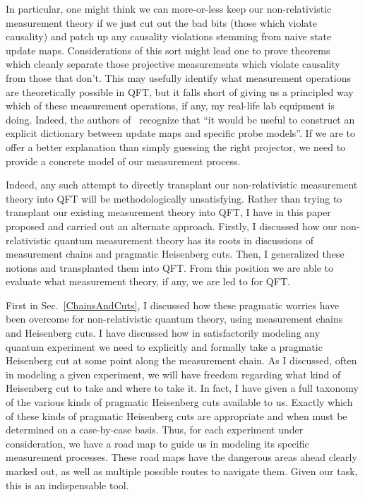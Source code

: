 \documentclass[prd,twocolumn,superscriptaddress,floatfix,amsmath,amssymb,amsfonts,nofootinbib]{revtex4-2}
\begin{document}
In particular, one might think we can more-or-less keep our non-relativistic measurement theory if we just cut out the bad bits (those which violate causality) and patch up any causality violations stemming from naive state update maps. Considerations of this sort might lead one to prove theorems~\cite{BorstenJubbKells,Jubb2022} which cleanly separate those projective measurements which violate causality from those that don't. This may usefully identify what measurement operations are theoretically possible in QFT, but it falls short of giving us a principled way which of these measurement operations, if any, my real-life lab equipment is doing. Indeed, the authors of~\cite{Jubb2022} recognize that ``it would be useful to construct an explicit
dictionary between update maps and specific probe models''. If we are to offer a better explanation than simply guessing the right projector, we need to provide a concrete model of our measurement process.

Indeed, any such attempt to directly transplant our non-relativistic measurement theory into QFT will be methodologically unsatisfying. Rather than trying to transplant our existing measurement theory into QFT, I have in this paper proposed and carried out an alternate approach. Firstly, I discussed how our non-relativistic quantum measurement theory has its roots in discussions of measurement chains and pragmatic Heisenberg cuts. Then, I generalized these notions and transplanted them into QFT. From this position we are able to evaluate what measurement theory, if any, we are led to for QFT. 

First in Sec.~\ref{ChainsAndCuts}, I discussed how these pragmatic worries have been overcome for non-relativistic quantum theory, using measurement chains and Heisenberg cuts. I have discussed how in satisfactorily modeling any quantum experiment we need to explicitly and formally take a pragmatic Heisenberg cut at some point along the measurement chain. As I discussed, often in modeling a given experiment, we will have freedom regarding what kind of Heisenberg cut to take and where to take it. In fact, I have given a full taxonomy of the various kinds of pragmatic Heisenberg cuts available to us. Exactly  which of these kinds of pragmatic Heisenberg cuts are appropriate and when must be determined on a case-by-case basis. Thus, for each experiment under consideration, we have a road map to guide us in modeling its specific measurement processes. These road maps have the dangerous areas ahead clearly marked out, as well as multiple possible routes to navigate them. Given our task, this is an indispensable tool.
\end{document}
